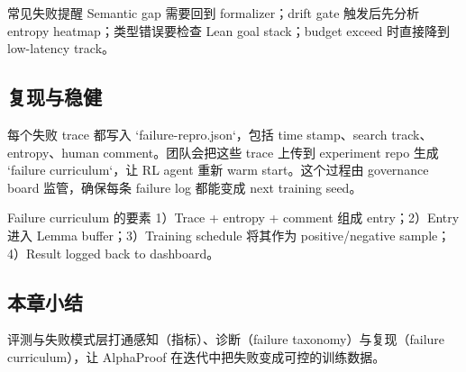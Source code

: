 \begin{warningbox}{常见失败提醒}
Semantic gap 需要回到 formalizer；drift gate 触发后先分析 entropy heatmap；类型错误要检查 Lean goal stack；budget exceed 时直接降到 low-latency track。
\end{warningbox}

\subsection{复现与稳健}
每个失败 trace 都写入 `failure-repro.json`，包括 time stamp、search track、entropy、human comment。团队会把这些 trace 上传到 experiment repo 生成 `failure curriculum`，让 RL agent 重新 warm start。这个过程由 governance board 监管，确保每条 failure log 都能变成 next training seed。

\begin{knowledgebox}{Failure curriculum 的要素}
1）Trace + entropy + comment 组成 entry；2）Entry 进入 Lemma buffer；3）Training schedule 将其作为 positive/negative sample；4）Result logged back to dashboard。
\end{knowledgebox}

\subsection{本章小结}
评测与失败模式层打通感知（指标）、诊断（failure taxonomy）与复现（failure curriculum），让 AlphaProof 在迭代中把失败变成可控的训练数据。
\newpage

